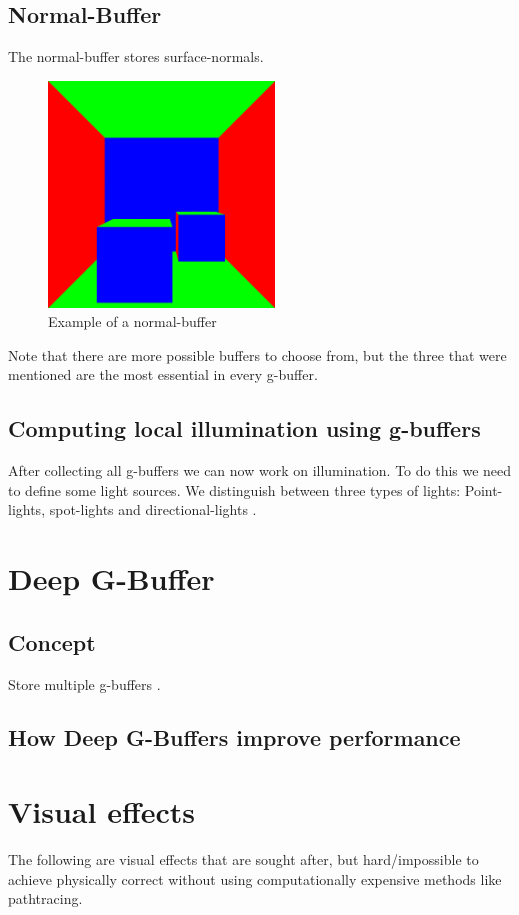\documentclass{ACGSeminar}
\begin{document}
	\subsection{Normal-Buffer}
		The normal-buffer stores surface-normals.
		\begin{figure}[htb!]%
			\begin{center}%
				\includegraphics[width=6cm]{img/normal_buffer.png}
			\end{center}%
			\caption{Example of a normal-buffer}%
			\label{fig:normal_buffer}%
		\end{figure}%
		Note that there are more possible buffers to choose from, but the three that were mentioned are the most essential in every g-buffer.
	\subsection{Computing local illumination using g-buffers}
		After collecting all g-buffers we can now work on illumination. To do this we need to define some light sources. We distinguish between three types of lights:
		Point-lights, spot-lights and directional-lights \cite{DST}.

\section{Deep G-Buffer}
	\subsection{Concept}
	Store multiple g-buffers \cite{NDGB}.
	\subsection{How Deep G-Buffers improve performance}

\section{Visual effects}
	The following are visual effects that are sought after, but hard/impossible to achieve physically correct without using
	computationally expensive methods like pathtracing. 
\end{document}
